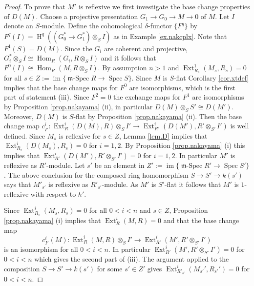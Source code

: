 \documentclass[a4paper,10pt]{amsart}
\theoremstyle{plain}
\theoremstyle{definition}
\theoremstyle{remark}
\numberwithin{equation}{xx}
\DeclareMathOperator{\Ext}{Ext}
\DeclareMathOperator{\cH}{H}
\DeclareMathOperator{\Hom}{Hom}
\DeclareMathOperator{\im}{im}
\DeclareMathOperator{\mSpec}{\fr{m}-Spec}
\DeclareMathOperator{\Spec}{Spec}
\newcommand{\co}{\colon}
\newcommand{\ra}{\rightarrow}
\newcommand{\lra}{\longrightarrow}
\newcommand{\ot}{{\otimes}}
\newcommand{\fr}[1]{\mathfrak{{#1}}}
\newcommand{\hm}[4]{{\Hom}_{#2}^{#1}({#3},{#4})}
\newcommand{\xt}[4]{{\Ext} _{#2}^{#1}({#3},{#4})}
\begin{document}
\begin{proof}
To prove that \(M'\) is reflexive we first investigate the base change properties of \(D(M)\). Choose a projective presentation \(G_{1}\ra G_{0}\ra M\ra 0\) of \(M\). Let \(I\) denote an \(S\)-module. Define the cohomological \(\delta\)-functor \(\{F^{q}\}\) by \(F^{q}(I)=\cH^{q}((G_{0}^{*}\ra G_{1}^{*})\ot_{S}I)\) as in Example \ref{ex.nakcplx}. Note that \(F^{1}(S)=D(M)\). Since the \(G_{i}\) are coherent and projective, \(G_{i}^{*}\ot_{S}I\cong \hm{}{R}{G_{i}}{R\ot_{S}I}\) and it follows that \(F^{0}(I)\cong \hm{}{R}{M}{R\ot_{S}I}\). By assumption \(n>1\) and \(\xt{1}{R_{s}}{M_{s}}{R_{s}}=0\) for all \(s\in Z:=\im\{\mSpec R\ra\Spec S\}\). Since \(M\) is \(S\)-flat Corollary \ref{cor.xtdef} implies that the base change maps for \(F^{0}\) are isomorphisms, which is the first part of statement (iii). Since \(F^{2}=0\) the exchange maps for \(F^{1}\) are isomorphisms by Proposition \ref{prop.nakayama} (ii), in particular \(D(M)\ot_{S}S'\cong D(M')\). Moreover, \(D(M)\) is \(S\)-flat by Proposition \ref{prop.nakayama} (ii). Then the base change map \(c^{i}_{I'}\co \xt{i}{R}{D(M)}{R}\ot_{S}I'\ra \xt{i}{R'}{D(M')}{R'\ot_{S'}I'}\) is well defined. Since \(M_{s}\) is reflexive for \(s\in Z\), Lemma \ref{lem.D} implies that \(\xt{i}{R_{s}}{D(M_{s})}{R_{s}}=0\) for \(i=1,2\). By Proposition \ref{prop.nakayama} (i) this implies that \(\xt{i}{R'}{D(M')}{R'\ot_{S'}I'}=0\) for \(i=1,2\). In particular \(M'\) is reflexive as \(R'\)-module. Let \(s'\) be an element in \(Z':=\im\{\mSpec R'\ra\Spec S'\}\). The above conclusion for the composed ring homomorphism \(S\ra S'\ra k(s')\) says that \(M'_{s'}\) is reflexive as \(R'_{s'}\)-module. As \(M'\) is \(S'\)-flat it follows that \(M'\) is \(1\)-reflexive with respect to \(h'\).

Since \(\xt{i}{R_{s}}{M_{s}}{R_{s}}=0\) for all \(0<i<n\) and \(s\in Z\), Proposition \ref{prop.nakayama} (i) implies that \(\xt{i}{R}{M}{R}=0\) and that the base change map
\begin{equation}
c^{i}_{I'}(M)\co \xt{i}{R}{M}{R}\ot_{S}I'\lra\xt{i}{R'}{M'}{R'\ot_{S'} I'}
\end{equation}
is an isomorphism for all \(0<i<n\). In particular \(\xt{i}{R'}{M'}{R'\ot_{S'}I'}=0\) for \(0<i<n\) which gives the second part of (iii). The argument applied to the composition \(S\ra S'\ra k(s')\) for some \(s'\in Z'\) gives \(\xt{i}{{R'\!\!}_{s'}}{M_{s'}'}{R_{s'}'}=0\) for \(0<i<n\). 


\end{proof}
\end{document}
